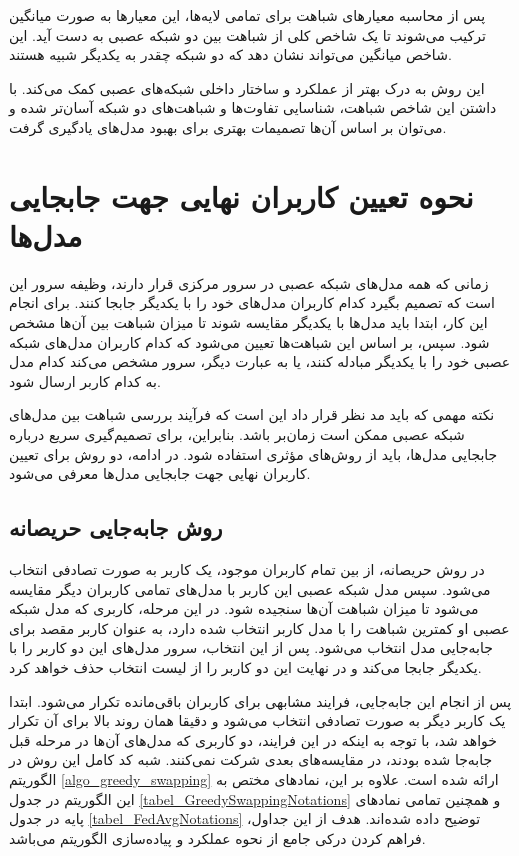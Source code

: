 پس از محاسبه معیارهای شباهت برای تمامی لایه‌ها، این معیارها به صورت میانگین ترکیب می‌شوند تا یک شاخص کلی از شباهت بین دو شبکه عصبی به دست آید. این شاخص میانگین می‌تواند نشان دهد که دو شبکه چقدر به یکدیگر شبیه هستند.

این روش به درک بهتر از عملکرد و ساختار داخلی شبکه‌های عصبی کمک می‌کند. با داشتن این شاخص شباهت، شناسایی تفاوت‌ها و شباهت‌های دو شبکه آسان‌تر شده و می‌توان بر اساس آن‌ها تصمیمات بهتری برای بهبود مدل‌های یادگیری گرفت.



\section{نحوه تعیین کاربران نهایی جهت جابجایی مدل‌ها}
زمانی که همه مدل‌های شبکه عصبی در سرور مرکزی قرار دارند، وظیفه سرور این است که تصمیم بگیرد کدام کاربران مدل‌های خود را با یکدیگر جابجا کنند. برای انجام این کار، ابتدا باید مدل‌ها با یکدیگر مقایسه شوند تا میزان شباهت بین آن‌ها مشخص شود. سپس، بر اساس این شباهت‌ها تعیین می‌شود که کدام کاربران مدل‌های شبکه عصبی خود را با یکدیگر مبادله کنند، یا به عبارت دیگر، سرور مشخص می‌کند کدام مدل به کدام کاربر ارسال شود.

نکته مهمی که باید مد نظر قرار داد این است که فرآیند بررسی شباهت بین مدل‌های شبکه عصبی ممکن است زمان‌بر باشد. بنابراین، برای تصمیم‌گیری سریع درباره جابجایی مدل‌ها، باید از روش‌های مؤثری استفاده شود. در ادامه، دو روش برای تعیین کاربران نهایی جهت جابجایی مدل‌ها معرفی می‌شود.


\subsection{
	روش جابه‌جایی حریصانه%
}
در روش حریصانه، از بین تمام کاربران موجود، یک کاربر به صورت تصادفی انتخاب می‌شود. سپس مدل شبکه عصبی این کاربر با مدل‌های تمامی کاربران دیگر مقایسه می‌شود تا میزان شباهت آن‌ها سنجیده شود. در این مرحله، کاربری که مدل شبکه عصبی او کمترین شباهت را با مدل کاربر انتخاب‌ شده دارد، به عنوان کاربر مقصد برای جابه‌جایی مدل انتخاب می‌شود. پس از این انتخاب، سرور مدل‌های این دو کاربر را با یکدیگر جابجا می‌کند و در نهایت این دو کاربر را از لیست انتخاب حذف خواهد کرد.

پس از انجام این جابه‌جایی، فرایند مشابهی برای کاربران باقی‌مانده تکرار می‌شود. ابتدا یک کاربر دیگر به صورت تصادفی انتخاب می‌شود و دقیقا همان روند بالا برای آن تکرار خواهد شد، با توجه به اینکه در این فرایند، دو کاربری که مدل‌های آن‌ها در مرحله قبل جابه‌جا شده بودند، در مقایسه‌های بعدی شرکت نمی‌کنند. شبه کد کامل این روش در الگوریتم
\ref{algo_greedy_swapping}
ارائه شده است. علاوه بر این، نمادهای مختص به این الگوریتم در جدول
\ref{tabel_GreedySwappingNotations}
و همچنین تمامی نمادهای پایه در جدول
\ref{tabel_FedAvgNotations}
توضیح داده شده‌اند.
هدف از این جداول، فراهم کردن درکی جامع از نحوه عملکرد و پیاده‌سازی الگوریتم می‌باشد.



